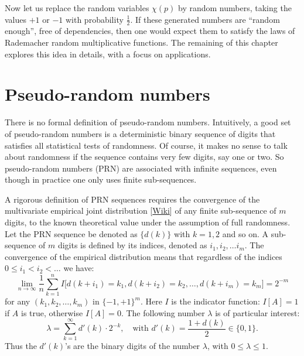 \documentclass[oneside,10pt]{book}
\begin{document}
Now let us replace the random variables $\chi(p)$
by \textcolor{index}{random numbers},
taking the values $+1$
 or $-1$ with probability $\frac{1}{2}$. If these generated numbers are ``random enough'', free of dependencies, then one would expect them to
 satisfy the laws of Rademacher random multiplicative functions. The remaining of this chapter explores this idea in
 details, with a focus on applications.

\section{Pseudo-random numbers}\label{prozaxheliumgas}

There is no formal definition of pseudo-random numbers. Intuitively, a good set of pseudo-random numbers is a
deterministic binary sequence of digits that satisfies all statistical tests of randomness. Of course, it makes no sense to talk about
randomness if the sequence contains very few digits, say one or two. So pseudo-random numbers (PRN) are associated with
 infinite sequences, even though in practice one only uses finite sub-sequences.


A rigorous definition of PRN sequences requires the convergence of the
multivariate \textcolor{index}{empirical joint distribution}
 [\href{https://en.wikipedia.org/wiki/Empirical_distribution_function}{Wiki}]
 of any finite sub-sequence of $m$ digits, to the known theoretical value under the assumption of full randomness.  Let the PRN
sequence be denoted as $\{d(k)\}$ with $k=1,2$ and so on. A sub-sequence of $m$ digits is defined by its indices, denoted as $i_1,i_2,\dots i_m$.  The convergence of the empirical distribution means that regardless
of the indices $0\leq i_1 < i_2< \dots$ we have:
\begin{equation}
 \lim_{n\rightarrow\infty} \frac{1}{n}\sum_{k=1}^n I\Big[d(k+i_1)=k_1,d(k+i_2)=k_2,\dots,d(k+i_m)=k_m\Big] = 2^{-m} \label{eqrdv}
\end{equation}
for any $(k_1,k_2,\dots,k_m)$ in $\{-1,+1\}^m$. Here $I$ is the indicator function: $I[A]=1$ if $A$ is true, otherwise $I[A]=0$. The following number $\lambda$ is of particular interest:
\begin{equation}
\lambda=\sum_{k=1}^\infty d'(k) \cdot 2^{-k}, \quad \text{with } d'(k)=\frac{1+d(k)}{2} \in \{0, 1\}. \label{zzxdx}
\end{equation}
Thus the $d'(k)$'s are the binary digits of the number $\lambda$, with $0\leq \lambda\leq 1$.
\end{document}
